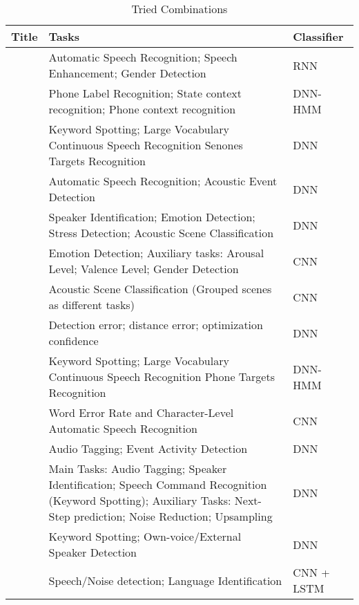 \begin{table}[ht]
	\caption{Tried Combinations} %
	\centering %
	\begin{tabular}{p{}p{}p{}} %
		\hline\hline %
		Title & Tasks & Classifier   \\ [0.5ex] %
		\hline %
		\citet{lu2004multitask} & Automatic Speech Recognition; Speech Enhancement; Gender Detection & RNN \\ \hline
		\citet{seltzer2013multi} & Phone Label Recognition; State context recognition; Phone context recognition & DNN-HMM \\ \hline
		\citet{panchapagesan2016multi} & Keyword Spotting; Large Vocabulary Continuous Speech Recognition Senones Targets Recognition & DNN \\ \hline
		\citet{sakti2016deep} & Automatic Speech Recognition; Acoustic Event Detection & DNN \\ \hline
		\citet{georgiev2017heterogeneous} \citet{georgiev2017low} & Speaker Identification; Emotion Detection; Stress Detection; Acoustic Scene Classification & DNN \\ \hline
		\citet{kim2017speech} & Emotion Detection; Auxiliary tasks: Arousal Level; Valence Level; Gender Detection & CNN \\ \hline
		\citet{nwe2017convolutional} & Acoustic Scene Classification (Grouped scenes as different tasks) & CNN \\ \hline
		\citet{phan2017dnn} & 	Detection error; distance error; optimization confidence &  DNN \\ \hline
		\citet{sun2017compressed} & Keyword Spotting; Large Vocabulary Continuous Speech Recognition Phone Targets Recognition & DNN-HMM \\ \hline
		\citet{kremer2018inductive} & Word Error Rate and Character-Level Automatic Speech Recognition & CNN \\ \hline
		\citet{morfi2018deep} & Audio Tagging; Event Activity Detection & DNN \\ \hline
		\citet{lee2019label} & Main Tasks: Audio Tagging; Speaker Identification; Speech Command Recognition (Keyword Spotting); Auxiliary Tasks: Next-Step prediction; Noise Reduction; Upsampling & DNN \\ \hline
		\citet{lopez2019keyword} & Keyword Spotting; Own-voice/External Speaker Detection & DNN\\ \hline
		\citet{meyer2019multi} & Speech/Noise detection; Language Identification & CNN + LSTM \\ \hline
	\end{tabular}
	\label{table:combinations} %
\end{table}

